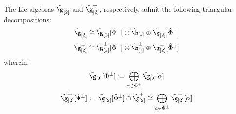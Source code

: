         \begin{corollary} \label{coro: triangular_decompositions_for_toroidal_lie_algebras}
            The Lie algebras $\tilde{\g}_{[2]}$ and $\tilde{\g}_{[2]}^{\pm}$, respectively, admit the following triangular decompositions:
                $$\tilde{\g}_{[2]} \cong \tilde{\g}_{[2]}[\hat{\Phi}^-] \oplus \tilde{\h}_{[1]} \oplus \tilde{\g}_{[2]}[\hat{\Phi}^+]$$
                $$\tilde{\g}_{[2]}^{\pm} \cong \tilde{\g}_{[2]}^{\pm}[\hat{\Phi}^-] \oplus \tilde{\h}_{[1]}^{\pm} \oplus \tilde{\g}_{[2]}^{\pm}[\hat{\Phi}^+]$$
            wherein:
                $$\tilde{\g}_{[2]}[\hat{\Phi}^{\pm}] := \bigoplus_{\alpha \in \hat{\Phi}^{\pm}} \tilde{\g}_{[2]}[\alpha]$$
                $$\tilde{\g}_{[2]}^{\pm}[\hat{\Phi}^{\pm}] := \tilde{\g}_{[2]}[\hat{\Phi}^{\pm}] \cap \tilde{\g}_{[2]}^{\pm} \cong \bigoplus_{\alpha \in \hat{\Phi}^{\pm}} \tilde{\g}_{[2]}^{\pm}[\alpha]$$
        \end{corollary}

